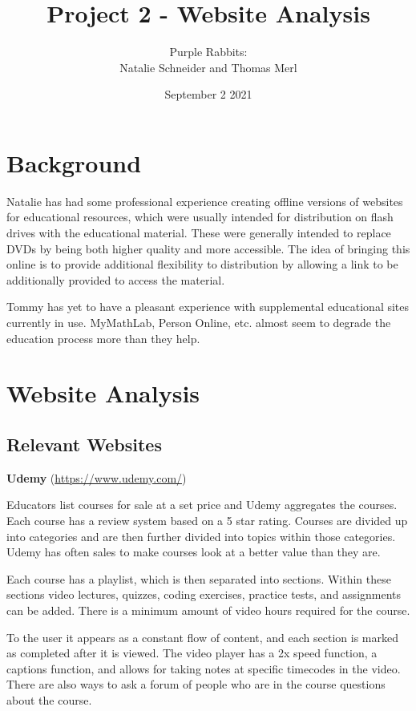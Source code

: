 \documentclass{article}
\title{Project 2 - Website Analysis}
\author{Purple Rabbits:\\Natalie Schneider and Thomas Merl}
\date{September 2 2021}
\begin{document}
\maketitle

\section{Background}

Natalie has had some professional experience creating offline versions of websites for educational resources, which were usually intended for distribution on flash drives with the educational material. These were generally intended to replace DVDs by being both higher quality and more accessible. The idea of bringing this online is to provide additional flexibility to distribution by allowing a link to be additionally provided to access the material.\vspace{\baselineskip}

Tommy has yet to have a pleasant experience with supplemental educational sites currently in use. MyMathLab, Person Online, etc. almost seem to degrade the education process more than they help.

\section{Website Analysis}
\subsection{Relevant Websites}
    
\textbf{Udemy} (\url{https://www.udemy.com/})

Educators list courses for sale at a set price and Udemy aggregates the courses. Each course has a review system based on a 5 star rating. Courses are divided up into categories and are then further divided into topics within those categories. Udemy has often sales to make courses look at a better value than they are.

Each course has a playlist, which is then separated into sections. Within these sections video lectures, quizzes, coding exercises, practice tests, and assignments can be added. There is a minimum amount of video hours required for the course.

To the user it appears as a constant flow of content, and each section is marked as completed after it is viewed. The video player has a 2x speed function, a captions function, and allows for taking notes at specific timecodes in the video. There are also ways to ask a forum of people who are in the course questions about the course. \vspace{\baselineskip}
\end{document}
